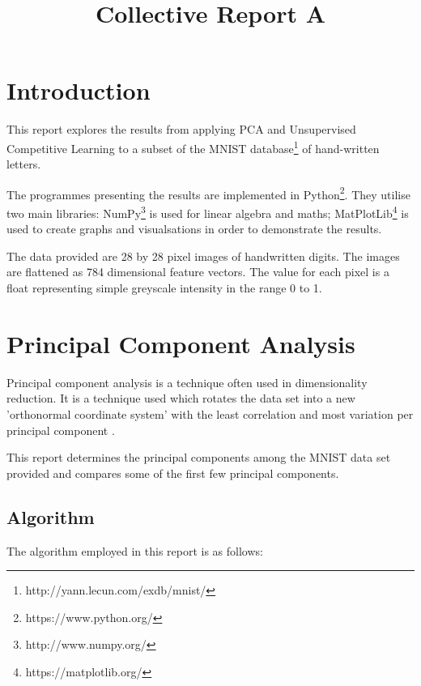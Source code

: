 \documentclass[11pt,journal,transmag,final]{IEEEtran}
\begin{document}
\title{Collective Report A}
\author{
}

\maketitle

\section{Introduction}

This report explores the results from applying PCA and Unsupervised Competitive Learning to a subset of the MNIST database\footnote{http://yann.lecun.com/exdb/mnist/} of hand-written letters.

The programmes presenting the results are implemented in Python\footnote{https://www.python.org/}. They utilise two main libraries: NumPy\footnote{http://www.numpy.org/} is used for linear algebra and maths; MatPlotLib\footnote{https://matplotlib.org/} is used to create graphs and visualsations in order to demonstrate the results.

The data provided are 28 by 28 pixel images of handwritten digits. The images are flattened as 784 dimensional feature vectors. The value for each pixel is a float representing simple greyscale intensity in the range 0 to 1.

\section{Principal Component Analysis}


Principal component analysis is a technique often used in dimensionality reduction. It is a technique used which rotates the data set into a new 'orthonormal coordinate system' with the least correlation and most variation per principal component \cite{eigenfaces}.

This report determines the principal components among the MNIST data set provided and compares some of the first few principal components.

\subsection{Algorithm}

The algorithm employed in this report is as follows:
\end{document}
